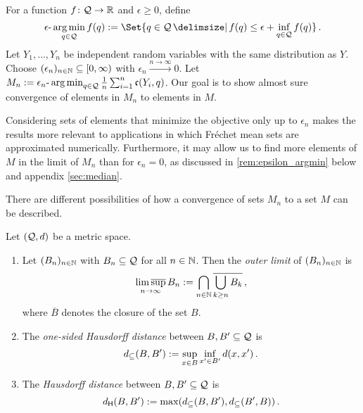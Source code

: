 For a function $f\colon\mathcal{Q}\to\mathbb{R}$ and $\epsilon\geq0$, define 
\begin{equation*}
	\epsilon\text{-}\argmin_{q\in\mc Q} f(q) := \Set{q \in \mc Q \given  f(q) \leq \epsilon +\inf_{q\in\mc Q} f(q) }
	\eqfs
\end{equation*}
Let $Y_1, \dots, Y_n$ be independent random variables with the same distribution as $Y$. Choose $(\epsilon_n)_{n\in\mathbb{N}}\subseteq [0,\infty)$ with $\epsilon_n \xrightarrow{n\to\infty}0$. Let $M_n := \epsilon_n\text{-}\operatorname*{arg\,min}_{q\in\mathcal{Q}} \frac1n \sum_{i=1}^n \mathfrak{c}(Y_i, q)$. Our goal is to show almost sure convergence of elements in $M_n$ to elements in $M$. 
%
\begin{remark}
	Considering sets of elements that minimize the objective only up to $\epsilon_n$ makes the results more relevant to applications in which Fréchet mean sets are approximated numerically.		
	Furthermore, it may allow us to find more elements of $M$ in the limit of $M_n$ than for $\epsilon_n=0$, as discussed in \autoref{rem:epsilon_argmin} below and appendix \ref{sec:median}.
\end{remark}
%
There are different possibilities of how a convergence of sets $M_n$ to a set $M$ can be described.
%
\begin{definition}
	Let $(\mathcal{Q}, d)$ be a metric space.
	\begin{enumerate}[label=(\roman*)]
		\item 
		Let $(B_n)_{n\in\mathbb{N}}$ with $B_n \subseteq \mathcal{Q}$ for all $n\in\mathbb{N}$. Then the \emph{outer limit} of $(B_n)_{n\in\mathbb{N}}$ is
		\begin{equation*}
			\operatorname*{lim\, \overline{sup}}_{n\to\infty} B_n := \bigcap_{n\in\mathbb{N}} \overline{\bigcup_{k\geq n} B_k}\, ,
		\end{equation*}
		where $\overline B$ denotes the closure of the set $B$.
		\item 
		The \emph{one-sided Hausdorff distance} between $B, B^\prime \subseteq \mathcal{Q}$ is
		\begin{equation*}
			d_\subseteq(B,B^\prime) := \sup_{x\in B} \inf_{x^\prime\in B^\prime} d(x,x^\prime)\, .
		\end{equation*}
		\item 
		The \emph{Hausdorff distance} between $B, B^\prime \subseteq \mathcal{Q}$ is
		\begin{equation*}
			d_{\mathsf{H}}(B, B^\prime) 
			:= 
			\max(d_\subseteq(B,B^\prime), d_\subseteq(B^\prime,B))
			\, .
		\end{equation*}
	\end{enumerate}
\end{definition}
